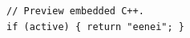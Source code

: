 \documentclass{article}
\begin{document}
\begin{verbatim}
// Preview embedded C++.
if (active) { return "eenei"; }
\end{verbatim}
\end{document}
